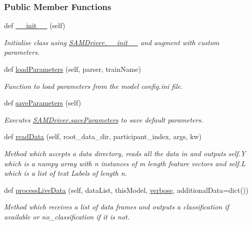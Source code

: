 \subsubsection*{Public Member Functions}
\begin{DoxyCompactItemize}
\item 
def \hyperlink{group__icubclient__SAM__Drivers_afae51ba28a26b423b2607e6cafa8ef3b}{\+\_\+\+\_\+init\+\_\+\+\_\+} (self)
\begin{DoxyCompactList}\small\item\em Initialise class using \hyperlink{group__icubclient__SAM__Drivers_gac35ec3eea80d1fb5704758a9c53267a1}{S\+A\+M\+Driver.\+\_\+\+\_\+init\+\_\+\+\_\+} and augment with custom parameters. \end{DoxyCompactList}\item 
def \hyperlink{group__icubclient__SAM__Drivers_a19a7560a34cf400d887b8dfc99c2e666}{load\+Parameters} (self, parser, train\+Name)
\begin{DoxyCompactList}\small\item\em Function to load parameters from the model config.\+ini file. \end{DoxyCompactList}\item 
def \hyperlink{group__icubclient__SAM__Drivers_a18cf4294387e41e3ad97dbf4d84e08aa}{save\+Parameters} (self)
\begin{DoxyCompactList}\small\item\em Executes \hyperlink{group__icubclient__SAM__Drivers_gac6f300d2daf748b11b28802574b6f5e8}{S\+A\+M\+Driver.\+save\+Parameters} to save default parameters. \end{DoxyCompactList}\item 
def \hyperlink{group__icubclient__SAM__Drivers_ab9458625bb39c7575a96e7ccc63c8660}{read\+Data} (self, root\+\_\+data\+\_\+dir, participant\+\_\+index, args, kw)
\begin{DoxyCompactList}\small\item\em Method which accepts a data directory, reads all the data in and outputs self.\+Y which is a numpy array with n instances of m length feature vectors and self.\+L which is a list of text Labels of length n. \end{DoxyCompactList}\item 
def \hyperlink{group__icubclient__SAM__Drivers_a67d8509e605eac274321cdd30fd747e6}{process\+Live\+Data} (self, data\+List, this\+Model, \hyperlink{group__icubclient__SAM__Drivers_ga48cfefc6532ba606936b9fd7f3156da8}{verbose}, additional\+Data=dict())
\begin{DoxyCompactList}\small\item\em Method which receives a list of data frames and outputs a classification if available or \textquotesingle{}no\+\_\+classification\textquotesingle{} if it is not. \end{DoxyCompactList}\item 

\end{DoxyCompactItemize}
